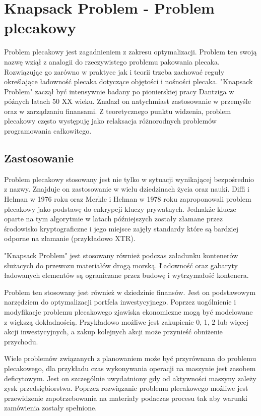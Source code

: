 \section{Knapsack Problem - Problem plecakowy}
\label{sec:knapsackProblem}
Problem plecakowy jest zagadnieniem z zakresu optymalizacji. Problem ten swoją nazwę wziął z analogii do rzeczywistego problemu pakowania plecaka. Rozwiązując go zarówno w praktyce jak i teorii trzeba zachować reguły określające ładowność plecaka dotyczące objętości i nośności plecaka. "Knapsack Problem" zaczął być intensywnie badany po pionierskiej pracy Dantziga\cite{DantzigArticle} w późnych latach 50 XX wieku. Znalazł on natychmiast zastosowanie w przemyśle oraz w zarządzaniu finansami. Z teoretycznego punktu widzenia, problem plecakowy często występuję jako relaksacja różnorodnych problemów programowania całkowitego\cite{PisingerThesis}.
\subsection{Zastosowanie}
Problem plecakowy stosowany jest nie tylko w sytuacji wynikającej bezpośrednio z nazwy. Znajduje on zastosowanie w wielu dziedzinach życia oraz nauki. Diffi i Helman\cite{DiffieHelmanArticle} w 1976 roku oraz Merkle i Helman\cite{MerkleHelmanArticle} w 1978 roku zaproponowali problem plecakowy jako podstawę do enkrypcji kluczy prywatnych. Jednakże klucze oparte na tym algorytmie w latach późniejszych zostały złamane przez środowisko kryptograficzne i jego miejsce zajęły standardy które są bardziej odporne na złamanie (przykładowo XTR).

"Knapsack Problem" jest stosowany również podczas załadunku kontenerów służacych do przewozu materiałów drogą morską. Ładowność oraz gabaryty ładowanych elementów są ograniczane przez budowę i wytrzymałość kontenera.

Problem ten stosowany jest również w dziedzinie finansów. Jest on podstawowym narzędziem do optymalizacji portfela inwestycyjnego. Poprzez uogólnienie i modyfikacje problemu plecakowego zjawiska ekonomiczne mogą być modelowane z większą dokładnością. Przykładowo możliwe jest zakupienie 0, 1, 2 lub więcej akcji inwestycyjnych, a zakup kolejnych akcji może przynieść obniżenie przychodu.

Wiele problemów związanych z planowaniem może być przyrównana do problemu plecakowego, dla przykładu czas wykonywania operacji na maszynie jest zasobem deficytowym. Jest on szczególnie uwydatniony gdy od aktywności maszyny zależy zysk przedsiębiorstwa. Poprzez rozwiązanie problemu plecakowego możliwe jest przewidzenie zapotrzebowania na materiały podaczas procesu tak aby warunki zamówienia zostały spełnione\cite{BartholdiChapter}.

